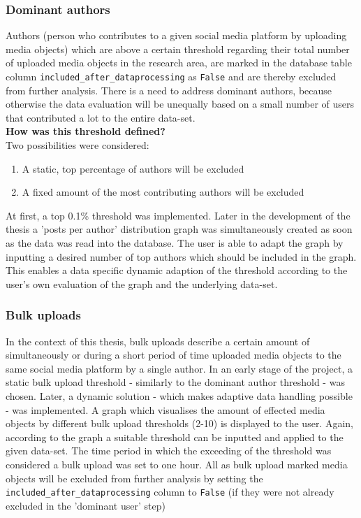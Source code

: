 \subsubsection{Dominant authors} \label{bias_dominant_authors}
Authors (person who contributes to a given social media platform by uploading media objects) which are above a certain threshold regarding their total number of uploaded media objects in the research area, are marked in the database table column \texttt{included\_after\_dataprocessing} as \texttt{False} and are thereby excluded from further analysis. There is a need to address dominant authors, because otherwise the data evaluation will be unequally based on a small number of users that contributed a lot to the entire data-set.\\
\newline
\textbf{How was this threshold defined?}\\
\newline
Two possibilities were considered:
\begin{enumerate}
  \item A static, top percentage of authors will be excluded
  \item A fixed amount of the most contributing authors will be excluded
\end{enumerate}

At first, a top 0.1\% threshold was implemented. Later in the development of the thesis a 'posts per author' distribution graph was simultaneously created as soon as the data was read into the database. The user is able to adapt the graph by inputting a desired number of top authors which should be included in the graph. This enables a data specific dynamic adaption of the threshold according to the user's own evaluation of the graph and the underlying data-set.

\subsubsection{Bulk uploads} \label{bias_bulk_uploads}
In the context of this thesis, bulk uploads describe a certain amount of simultaneously or during a short period of time uploaded media objects to the same social media platform by a single author. In an early stage of the project, a static bulk upload threshold - similarly to the dominant author threshold - was chosen. Later, a dynamic solution - which makes adaptive data handling possible - was implemented. A graph which visualises the amount of effected media objects by different bulk upload thresholds (2-10) is displayed to the user. Again, according to the graph a suitable threshold can be inputted and applied to the given data-set. The time period in which the exceeding of the threshold was considered a bulk upload was set to one hour. 
All as bulk upload marked media objects will be excluded from further analysis by setting the \texttt{included\_after\_dataprocessing} column to \texttt{False} (if they were not already excluded in the 'dominant user' step)

